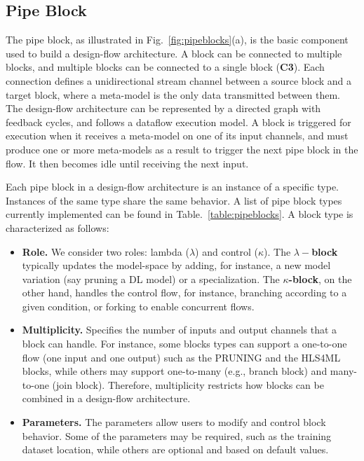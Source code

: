 \subsection{Pipe Block}

The pipe block, as illustrated in Fig.~\ref{fig:pipeblocks}(a), is the basic component used to build a design-flow architecture. A block can be connected to multiple blocks, and multiple blocks can be connected to a single block (\textbf{C3}). Each connection defines a unidirectional stream channel between a source block and a target block, where a meta-model is the only data transmitted between them. The design-flow architecture can be represented by a directed graph with feedback cycles, and follows a dataflow execution model. A block is triggered for execution when it receives a meta-model on one of its input channels, and must produce one or more meta-models as a result to trigger the next pipe block in the flow. It then becomes idle until receiving the next input.

Each pipe block in a design-flow architecture is an instance of a specific type. Instances of the same type share the same behavior. A list of pipe block types currently implemented can be found in Table.~\ref{table:pipeblocks}. A block type is characterized as follows:
\begin{itemize}
\item \textbf{Role.} We consider two roles: lambda ($\lambda$) and control ($\kappa$). The \textbf{$\lambda-$block} typically updates the model-space by adding, for instance, a new model variation (say pruning a DL model) or a specialization. The \textbf{$\kappa$-block}, on the other hand, handles the control flow, for instance, branching according to a given condition, or forking to enable concurrent flows. 
\item \textbf{Multiplicity.} Specifies the number of inputs and output channels that a block can handle. For instance, some blocks types can support a one-to-one flow (one input and one output) such as the PRUNING and the HLS4ML blocks, while others may support one-to-many (e.g., branch block) and many-to-one (join block). Therefore, multiplicity restricts how blocks can be combined in a design-flow architecture.
\item \textbf{Parameters.} The parameters allow users to modify and control block behavior. Some of the parameters may be required, such as the training dataset location, while others are optional and based on default values. 
\end{itemize}

